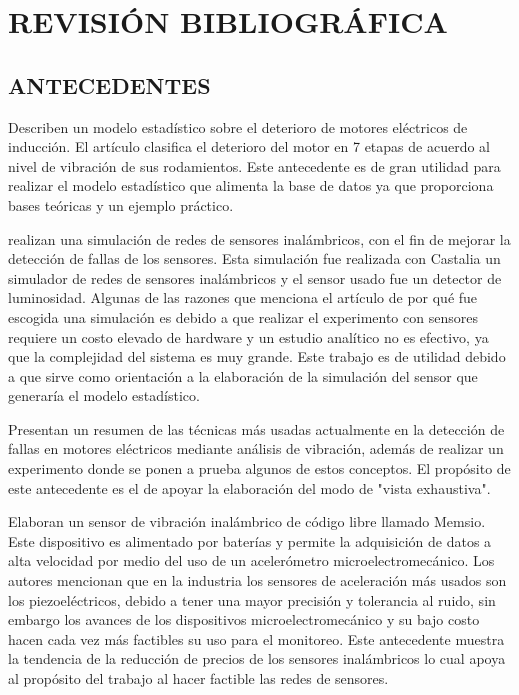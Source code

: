 \thispagestyle{empty}

\section{REVISIÓN BIBLIOGRÁFICA}

\subsection{ANTECEDENTES}

\textcite{Ramazan} Describen un modelo estadístico sobre el deterioro de
motores eléctricos de inducción. El artículo clasifica el deterioro del motor
en 7 etapas de acuerdo al nivel de vibración de sus rodamientos. Este
antecedente es de gran utilidad para realizar el modelo estadístico que alimenta
la base de datos ya que proporciona bases teóricas y un ejemplo práctico.

\textcite{Pinto} realizan una simulación de redes de sensores inalámbricos, con
el fin de mejorar la detección de fallas de los sensores. Esta simulación fue
realizada con Castalia un simulador de redes de sensores inalámbricos y el
sensor usado fue un detector de luminosidad. Algunas de las razones que
menciona el artículo de por qué fue escogida una simulación es debido a que
realizar el experimento con sensores requiere un costo elevado de hardware y un
estudio analítico no es efectivo, ya que la complejidad del sistema es muy
grande. Este trabajo es de utilidad debido a que sirve como orientación a la
elaboración de la simulación del sensor que generaría el modelo estadístico.

\textcite{Ugwiri} Presentan un resumen de las técnicas más usadas actualmente
en la detección de fallas en motores eléctricos mediante análisis de vibración,
además de realizar un experimento donde se ponen a prueba algunos de estos
conceptos. El propósito de este antecedente es el de apoyar la elaboración del
modo de "vista exhaustiva".

\textcite{Koene} Elaboran un sensor de vibración inalámbrico de código libre
llamado Memsio. Este dispositivo es alimentado por baterías y permite la
adquisición de datos a alta velocidad por medio del uso de un acelerómetro
microelectromecánico. Los autores mencionan que en la industria los sensores de
aceleración más usados son los piezoeléctricos, debido a tener una mayor
precisión y tolerancia al ruido, sin embargo los avances de los dispositivos
microelectromecánico y su bajo costo hacen cada vez más factibles su uso para
el monitoreo. Este antecedente muestra la tendencia de la reducción de precios
de los sensores inalámbricos lo cual apoya al propósito del trabajo al hacer
factible las redes de sensores.

